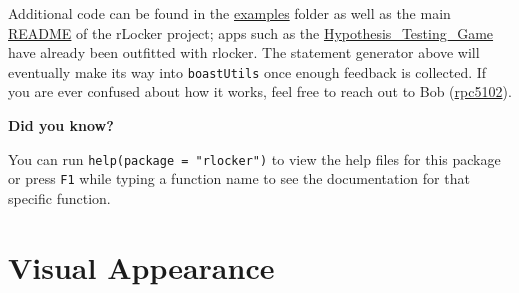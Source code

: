 \documentclass[
]{book}
\newenvironment{Shaded}{\begin{snugshade}}{\end{snugshade}}
\newcommand{\CommentTok}[1]{\textcolor[rgb]{0.56,0.35,0.01}{\textit{#1}}}
\newcommand{\DataTypeTok}[1]{\textcolor[rgb]{0.13,0.29,0.53}{#1}}
\newcommand{\KeywordTok}[1]{\textcolor[rgb]{0.13,0.29,0.53}{\textbf{#1}}}
\newcommand{\NormalTok}[1]{#1}
\newcommand{\OperatorTok}[1]{\textcolor[rgb]{0.81,0.36,0.00}{\textbf{#1}}}
\newcommand{\OtherTok}[1]{\textcolor[rgb]{0.56,0.35,0.01}{#1}}
\newcommand{\RegionMarkerTok}[1]{#1}
\newcommand{\StringTok}[1]{\textcolor[rgb]{0.31,0.60,0.02}{#1}}
\begin{document}
\begin{Shaded}
\end{Shaded}

Additional code can be found in the \href{https://github.com/rpc5102/rlocker/tree/master/inst/examples}{examples} folder as well as the main \href{https://github.com/rpc5102/rlocker/blob/master/README.md}{README} of the rLocker project; apps such as the \href{https://github.com/EducationShinyAppTeam/Hypothesis_Testing_Game}{Hypothesis\_Testing\_Game} have already been outfitted with rlocker. The statement generator above will eventually make its way into \texttt{boastUtils} once enough feedback is collected. If you are ever confused about how it works, feel free to reach out to Bob (\href{mailto:rpc5102@psu.edu}{rpc5102}).

\textbf{Did you know?}

You can run \texttt{help(package\ =\ "rlocker")} to view the help files for this package or press \texttt{F1} while typing a function name to see the documentation for that specific function.

\hypertarget{part-visual-appearance}{%
\part{Visual Appearance}\label{part-visual-appearance}}
\end{document}
